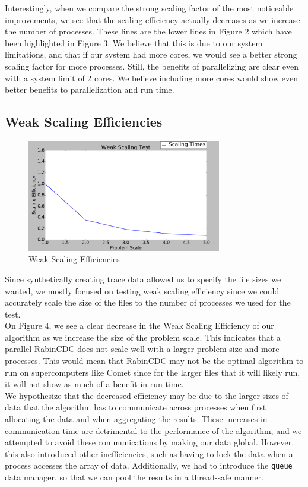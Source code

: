 \documentclass{acmtog} %
\begin{document}
	Interestingly, when we compare the strong scaling factor of the most noticeable improvements, we see that the scaling efficiency actually decreases as we increase the number of processes. These lines are the lower lines in Figure 2 which have been highlighted in Figure 3. We believe that this is due to our system limitations, and that if our system had more cores, we would see a better strong scaling factor for more processes. Still, the benefits of parallelizing are clear even with a system limit of 2 cores. We believe including more cores would show even better benefits to parallelization and run time. 
	
	\subsection{Weak Scaling Efficiencies}
		\begin{figure}
			\centerline{\includegraphics[width=8.5cm]{img/WeakScalingOnly}}
			\caption{Weak Scaling Efficiencies}
			\label{fig:weakscaleonly}
		\end{figure}

	Since synthetically creating trace data allowed us to specify the file sizes we wanted, we mostly focused on testing weak scaling efficiency since we could accurately scale the size of the files to the number of processes we used for the test.\\ 
	
	On Figure 4, we see a clear decrease in the Weak Scaling Efficiency of our algorithm as we increase the size of the problem scale. This indicates that a parallel RabinCDC does not scale well with a larger problem size and more processes. This would mean that RabinCDC may not be the optimal algorithm to run on supercomputers like Comet since for the larger files that it will likely run, it will not show as much of a benefit in run time. \\
	
	We hypothesize that the decreased efficiency may be due to the larger sizes of data that the algorithm has to communicate across processes when first allocating the data and when aggregating the results. These increases in communication time are detrimental to the performance of the algorithm, and we attempted to avoid these communications by making our data global. However, this also introduced other inefficiencies, such as having to lock the data when a process accesses the array of data. Additionally, we had to introduce the \texttt{queue} data manager, so that we can pool the results in a thread-safe manner. \\
	
\end{document}
